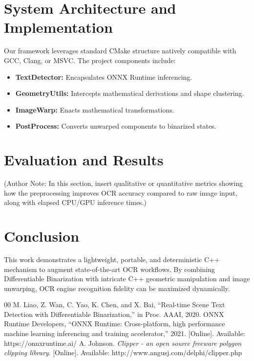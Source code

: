 \documentclass[conference]{IEEEtran}
\begin{document}
\section{System Architecture and Implementation}
Our framework leverages standard CMake structure natively compatible with GCC, Clang, or MSVC. The project components include:
\begin{itemize}
    \item \textbf{TextDetector:} Encapsulates ONNX Runtime inferencing.
    \item \textbf{GeometryUtils:} Intercepts mathematical derivations and shape clustering.
    \item \textbf{ImageWarp:} Enacts mathematical transformations.
    \item \textbf{PostProcess:} Converts unwarped components to binarized states.
\end{itemize}

\section{Evaluation and Results}
(Author Note: In this section, insert qualitative or quantitative metrics showing how the preprocessing improves OCR accuracy compared to raw image input, along with elapsed CPU/GPU inference times.)

\section{Conclusion}
This work demonstrates a lightweight, portable, and deterministic C++ mechanism to augment state-of-the-art OCR workflows. By combining Differentiable Binarization with intricate C++ geometric manipulation and image unwarping, OCR engine recognition fidelity can be maximized dynamically.

\begin{thebibliography}{00}
 M. Liao, Z. Wan, C. Yao, K. Chen, and X. Bai, ``Real-time Scene Text Detection with Differentiable Binarization,'' in Proc. AAAI, 2020.
 ONNX Runtime Developers, ``ONNX Runtime: Cross-platform, high performance machine learning inferencing and training accelerator,'' 2021. [Online]. Available: https://onnxruntime.ai/
 A. Johnson. \textit{Clipper - an open source freeware polygon clipping library}. [Online]. Available: http://www.angusj.com/delphi/clipper.php
\end{thebibliography}
\end{document}
